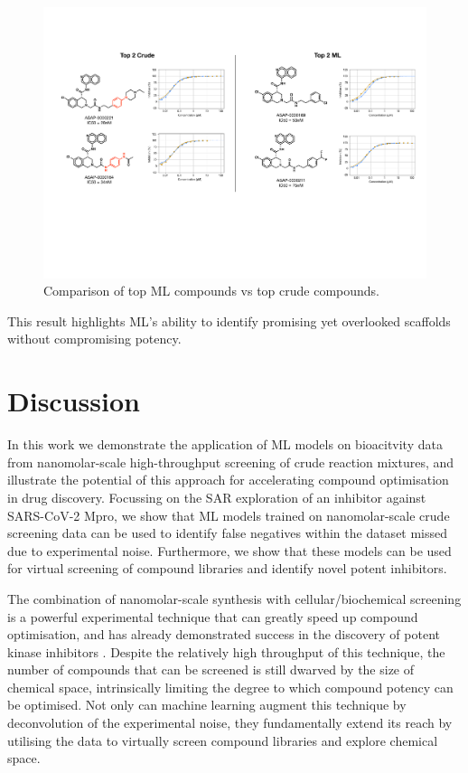 \begin{figure}[!t]
    \centering
    \includegraphics[width=\textwidth]{Chapters/Crude/Figs/ml_vs_crude.pdf}
    \caption{Comparison of top ML compounds vs top crude compounds.}
    \label{fig:ml_vs_crude}
\end{figure}

This result highlights ML's ability to identify promising yet overlooked scaffolds without compromising potency. 

\section{Discussion}

In this work we demonstrate the application of ML models on bioacitvity data from nanomolar-scale high-throughput screening of crude reaction mixtures, and illustrate the potential of this approach for accelerating compound optimisation in drug discovery. Focussing on the SAR exploration of an inhibitor against SARS-CoV-2 Mpro, we show that ML models trained on nanomolar-scale crude screening data can be used to identify false negatives within the dataset missed due to experimental noise. Furthermore, we show that these models can be used for virtual screening of compound libraries and identify novel potent inhibitors.

The combination of nanomolar-scale synthesis with cellular/biochemical screening is a powerful experimental technique that can greatly speed up compound optimisation, and has already demonstrated success in the discovery of potent kinase inhibitors \cite{Gesmundo2018nanosar, Gehrtz2022nanomolar}. Despite the relatively high throughput of this technique, the number of compounds that can be screened is still dwarved by the size of chemical space, intrinsically limiting the degree to which compound potency can be optimised. Not only can machine learning augment this technique by deconvolution of the experimental noise, they fundamentally extend its reach by utilising the data to virtually screen compound libraries and explore chemical space.

